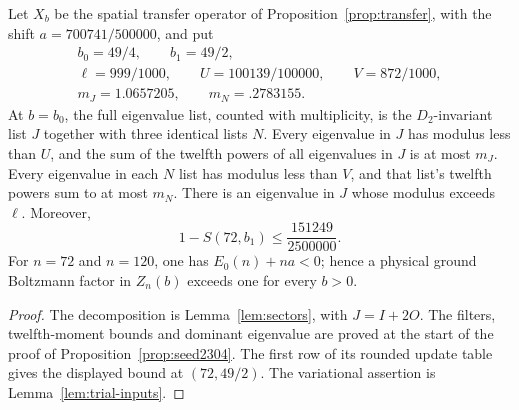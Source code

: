 \begin{corollary}
\label{cor:boundary-inputs}
Let $X_b$ be the spatial transfer operator of
Proposition~\ref{prop:transfer}, with the shift $a=700741/500000$,
and put
\[
 \begin{gathered}
 b_0=49/4,\qquad b_1=49/2,\\
 \ell=999/1000,\qquad U=100139/100000,\qquad V=872/1000,\\
 m_J=1.0657205,\qquad m_N=.2783155.
 \end{gathered}
\]
At $b=b_0$, the full eigenvalue list, counted with multiplicity,
is the $D_2$-invariant list $J$ together with three identical lists $N$.
Every eigenvalue in $J$ has modulus less than $U$, and the sum of the
twelfth powers of all eigenvalues in $J$ is at most $m_J$.  Every eigenvalue in each $N$ list
has modulus less than $V$, and that list's twelfth powers sum to at
most $m_N$.  There is an eigenvalue in $J$ whose modulus exceeds $\ell$.
Moreover,
\[
 1-S(72,b_1)\le\frac{151249}{2500000}.
\]
For $n=72$ and $n=120$, one has $E_0(n)+na<0$; hence a physical ground
Boltzmann factor in $Z_n(b)$ exceeds one for every $b>0$.
\end{corollary}

\begin{proof}
The decomposition is Lemma~\ref{lem:sectors}, with $J=I+2O$.
The filters, twelfth-moment bounds and dominant eigenvalue are proved
at the start of the proof of Proposition~\ref{prop:seed2304}.
The first row of its rounded update table gives the displayed bound
at $(72,49/2)$.  The variational assertion is
Lemma~\ref{lem:trial-inputs}.
\end{proof}

